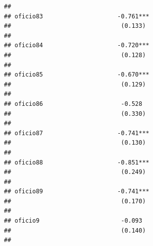 \documentclass[
]{article}
\begin{document}
\begin{verbatim}
##                                                                                                     
## oficio83                     -0.761***                                                              
##                               (0.133)                                                               
##                                                                                                     
## oficio84                     -0.720***                                                              
##                               (0.128)                                                               
##                                                                                                     
## oficio85                     -0.670***                                                              
##                               (0.129)                                                               
##                                                                                                     
## oficio86                      -0.528                                                                
##                               (0.330)                                                               
##                                                                                                     
## oficio87                     -0.741***                                                              
##                               (0.130)                                                               
##                                                                                                     
## oficio88                     -0.851***                                                              
##                               (0.249)                                                               
##                                                                                                     
## oficio89                     -0.741***                                                              
##                               (0.170)                                                               
##                                                                                                     
## oficio9                       -0.093                                                                
##                               (0.140)                                                               
##                                                                                                     

\end{verbatim}
\end{document}

